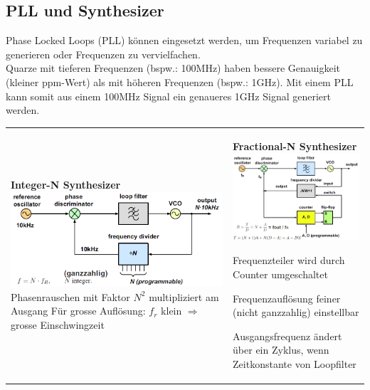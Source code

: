 \newpage
\subsection{PLL und Synthesizer }
Phase Locked Loops (PLL) können eingesetzt werden, um Frequenzen variabel zu
generieren oder Frequenzen zu vervielfachen. \\
Quarze mit tieferen Frequenzen (bspw.: 100MHz) haben bessere Genauigkeit
(kleiner ppm-Wert) als mit höheren Frequenzen (bspw.: 1GHz). Mit einem PLL kann
somit aus einem 100MHz Signal ein genaueres 1GHz Signal generiert werden. \\

\begin{tabular}{ll} 
\parbox{9cm}{
	\textbf{Integer-N Synthesizer} \\ 
	\includegraphics[width=9cm]{./bilder/components_pll_integerNsynthesizer.png}\\
	Phasenrauschen mit Faktor $N^2$ multipliziert am Ausgang \\
	Für grosse Auflösung: $f_r$ klein $\Rightarrow$ grosse Einschwingzeit}
& \parbox{9cm}{  
	\textbf{Fractional-N Synthesizer} \\
	\includegraphics[width=7.5cm]{./bilder/components_pll_fractorialNsynthesizer.png}\\
	\begin{liste}
      \item Frequenzteiler wird durch Counter umgeschaltet
      \item Frequenzauflösung feiner (nicht ganzzahlig) einstellbar
      \item Ausgangsfrequenz ändert über ein Zyklus, wenn Zeitkonstante von Loopfilter

\end{liste}}
\end{tabular}
